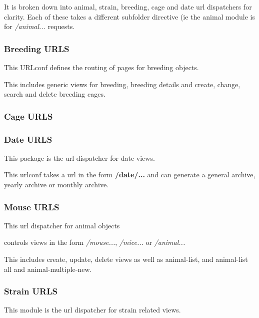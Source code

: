 \documentclass[letterpaper,10pt,english]{sphinxmanual}
\begin{document}
It is broken down into animal, strain, breeding, cage and date url dispatchers for clarity.
Each of these takes a different subfolder directive (ie the animal module is for \emph{/animal...} requests.


\subsubsection{Breeding URLS}
\label{animals:module-mousedb.animal.urls.breeding}\label{animals:breeding-urls}
This URLconf defines the routing of pages for breeding objects.

This includes generic views for breeding, breeding details and create, change, search and delete breeding cages.


\subsubsection{Cage URLS}
\label{animals:cage-urls}\label{animals:module-mousedb.animal.urls.cage}

\subsubsection{Date URLS}
\label{animals:module-mousedb.animal.urls.date}\label{animals:date-urls}
This package is the url dispatcher for date views.

This urlconf takes a url in the form \textbf{/date/...} and can generate a general archive, yearly archive or monthly archive.


\subsubsection{Mouse URLS}
\label{animals:module-mousedb.animal.urls.mouse}\label{animals:mouse-urls}
This url dispatcher for animal objects

controls views in the form \emph{/mouse...}, \emph{/mice...} or \emph{/animal...}

This includes create, update, delete views as well as animal-list, and animal-list all and animal-multiple-new.


\subsubsection{Strain URLS}
\label{animals:strain-urls}\label{animals:module-mousedb.animal.urls.strain}
This module is the url dispatcher for strain related views.
\end{document}
